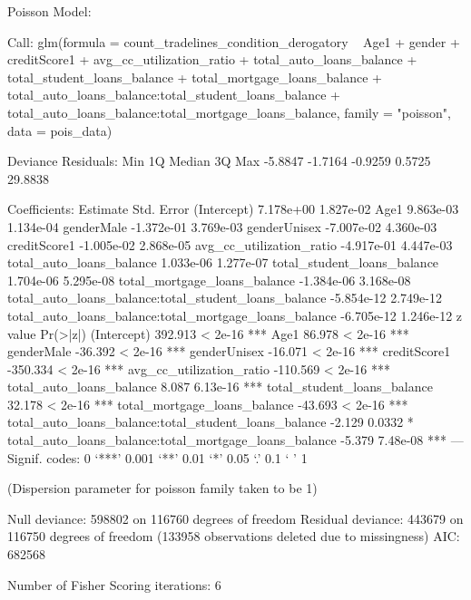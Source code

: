\documentclass[11pt]{llncs}
\begin{document}
\bigbreak
{\Large Poisson Model:}
\tiny
\begin{Schunk}
\begin{Soutput}
Call:
glm(formula = count_tradelines_condition_derogatory ~ Age1 + 
    gender + creditScore1 + avg_cc_utilization_ratio + total_auto_loans_balance + 
    total_student_loans_balance + total_mortgage_loans_balance + 
    total_auto_loans_balance:total_student_loans_balance + total_auto_loans_balance:total_mortgage_loans_balance, 
    family = "poisson", data = pois_data)

Deviance Residuals: 
    Min       1Q   Median       3Q      Max  
-5.8847  -1.7164  -0.9259   0.5725  29.8838  

Coefficients:
                                                        Estimate Std. Error
(Intercept)                                            7.178e+00  1.827e-02
Age1                                                   9.863e-03  1.134e-04
genderMale                                            -1.372e-01  3.769e-03
genderUnisex                                          -7.007e-02  4.360e-03
creditScore1                                          -1.005e-02  2.868e-05
avg_cc_utilization_ratio                              -4.917e-01  4.447e-03
total_auto_loans_balance                               1.033e-06  1.277e-07
total_student_loans_balance                            1.704e-06  5.295e-08
total_mortgage_loans_balance                          -1.384e-06  3.168e-08
total_auto_loans_balance:total_student_loans_balance  -5.854e-12  2.749e-12
total_auto_loans_balance:total_mortgage_loans_balance -6.705e-12  1.246e-12
                                                       z value Pr(>|z|)    
(Intercept)                                            392.913  < 2e-16 ***
Age1                                                    86.978  < 2e-16 ***
genderMale                                             -36.392  < 2e-16 ***
genderUnisex                                           -16.071  < 2e-16 ***
creditScore1                                          -350.334  < 2e-16 ***
avg_cc_utilization_ratio                              -110.569  < 2e-16 ***
total_auto_loans_balance                                 8.087 6.13e-16 ***
total_student_loans_balance                             32.178  < 2e-16 ***
total_mortgage_loans_balance                           -43.693  < 2e-16 ***
total_auto_loans_balance:total_student_loans_balance    -2.129   0.0332 *  
total_auto_loans_balance:total_mortgage_loans_balance   -5.379 7.48e-08 ***
---
Signif. codes:  0 ‘***’ 0.001 ‘**’ 0.01 ‘*’ 0.05 ‘.’ 0.1 ‘ ’ 1

(Dispersion parameter for poisson family taken to be 1)

    Null deviance: 598802  on 116760  degrees of freedom
Residual deviance: 443679  on 116750  degrees of freedom
  (133958 observations deleted due to missingness)
AIC: 682568

Number of Fisher Scoring iterations: 6
\end{Soutput}
\end{Schunk}
\end{document}
